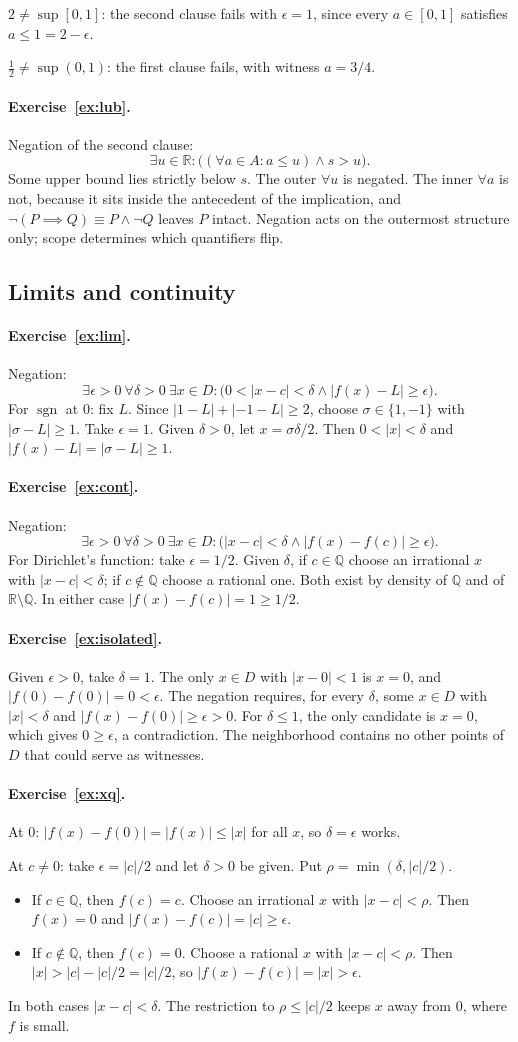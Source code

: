 \documentclass{workbook}
\theoremstyle{definition}
\newcommand{\Q}{\mathbb{Q}}
\newcommand{\R}{\mathbb{R}}
\newcommand{\ans}[1]{\paragraph{Exercise~\ref{#1}.}}
\begin{document}
$2 \ne \sup [0,1]$: the second clause fails with $\epsilon = 1$, since every $a \in [0,1]$ satisfies $a \le 1 = 2 - \epsilon$.

$\tfrac12 \ne \sup (0,1)$: the first clause fails, with witness $a = 3/4$.

\ans{ex:lub}
Negation of the second clause:
\[
  \exists u \in \R : \bigl( (\forall a \in A : a \le u) \land s > u \bigr).
\]
Some upper bound lies strictly below $s$. The outer $\forall u$ is negated. The inner $\forall a$ is not, because it sits inside the antecedent of the implication, and $\neg(P \implies Q) \equiv P \land \neg Q$ leaves $P$ intact. Negation acts on the outermost structure only; scope determines which quantifiers flip.

\subsection*{Limits and continuity}

\ans{ex:lim}
Negation:
\[
  \exists \epsilon > 0\ \forall \delta > 0\ \exists x \in D : \bigl(0 < |x - c| < \delta \land |f(x) - L| \ge \epsilon\bigr).
\]
For $\operatorname{sgn}$ at $0$: fix $L$. Since $|1 - L| + |{-1} - L| \ge 2$, choose $\sigma \in \{1, -1\}$ with $|\sigma - L| \ge 1$. Take $\epsilon = 1$. Given $\delta > 0$, let $x = \sigma \delta / 2$. Then $0 < |x| < \delta$ and $|f(x) - L| = |\sigma - L| \ge 1$.

\ans{ex:cont}
Negation:
\[
  \exists \epsilon > 0\ \forall \delta > 0\ \exists x \in D : \bigl(|x - c| < \delta \land |f(x) - f(c)| \ge \epsilon\bigr).
\]
For Dirichlet's function: take $\epsilon = 1/2$. Given $\delta$, if $c \in \Q$ choose an irrational $x$ with $|x - c| < \delta$; if $c \notin \Q$ choose a rational one. Both exist by density of $\Q$ and of $\R \setminus \Q$. In either case $|f(x) - f(c)| = 1 \ge 1/2$.

\ans{ex:isolated}
Given $\epsilon > 0$, take $\delta = 1$. The only $x \in D$ with $|x - 0| < 1$ is $x = 0$, and $|f(0) - f(0)| = 0 < \epsilon$. The negation requires, for every $\delta$, some $x \in D$ with $|x| < \delta$ and $|f(x) - f(0)| \ge \epsilon > 0$. For $\delta \le 1$, the only candidate is $x = 0$, which gives $0 \ge \epsilon$, a contradiction. The neighborhood contains no other points of $D$ that could serve as witnesses.

\ans{ex:xq}
At $0$: $|f(x) - f(0)| = |f(x)| \le |x|$ for all $x$, so $\delta = \epsilon$ works.

At $c \ne 0$: take $\epsilon = |c|/2$ and let $\delta > 0$ be given. Put $\rho = \min(\delta, |c|/2)$.
\begin{itemize}
  \item If $c \in \Q$, then $f(c) = c$. Choose an irrational $x$ with $|x - c| < \rho$. Then $f(x) = 0$ and $|f(x) - f(c)| = |c| \ge \epsilon$.
  \item If $c \notin \Q$, then $f(c) = 0$. Choose a rational $x$ with $|x - c| < \rho$. Then $|x| > |c| - |c|/2 = |c|/2$, so $|f(x) - f(c)| = |x| > \epsilon$.
\end{itemize}
In both cases $|x - c| < \delta$. The restriction to $\rho \le |c|/2$ keeps $x$ away from $0$, where $f$ is small.
\end{document}
